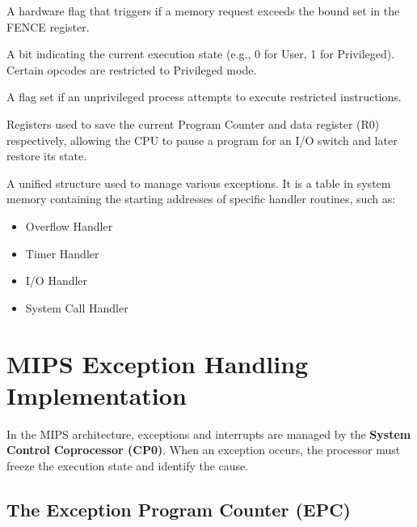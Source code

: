 \begin{vocabulary}
A hardware flag that triggers if a memory request exceeds the bound set in the FENCE register.
\end{vocabulary}

\begin{vocabulary}
A bit indicating the current execution state (e.g., 0 for User, 1 for Privileged). Certain opcodes are restricted to Privileged mode.
\end{vocabulary}

\begin{vocabulary}
A flag set if an unprivileged process attempts to execute restricted instructions.
\end{vocabulary}

\begin{vocabulary}
Registers used to save the current Program Counter and data register (R0) respectively, allowing the CPU to pause a program for an I/O switch and later restore its state.
\end{vocabulary}

\begin{definition}
A unified structure used to manage various exceptions. It is a table in system memory containing the starting addresses of specific handler routines, such as:

\begin{itemize}
    \item Overflow Handler
    \item Timer Handler
    \item I/O Handler
    \item System Call Handler
\end{itemize}

\end{definition}

\section{MIPS Exception Handling Implementation}
In the MIPS architecture, exceptions and interrupts are managed by the \textbf{System Control Coprocessor (CP0)}. When an exception occurs, the processor must freeze the execution state and identify the cause.

\subsection{The Exception Program Counter (EPC)}

